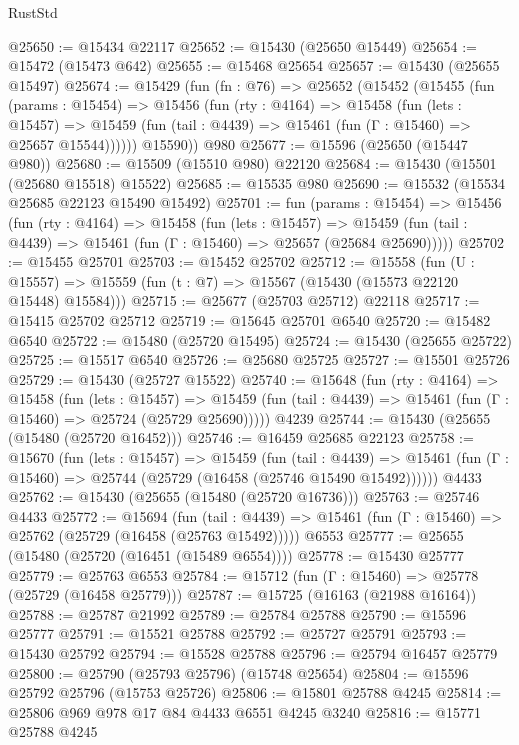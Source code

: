 \begin{lexlean}{RustStd}
\begin{coremodule}
{\begin{coremodule}
{{{{{{{{{{{{{{{{{{{{{{{{{{{{{{{{{{{{{{{{{{{{{{{{{{{{{{{{{{{{@25650 := @15434 @22117
@25652 := @15430 (@25650 @15449)
@25654 := @15472 (@15473 @642)
@25655 := @15468 @25654
@25657 := @15430 (@25655 @15497)
@25674 := @15429
    (fun (fn : @76) =>
    @25652
      (@15452
        (@15455
          (fun (params : @15454) =>
          @15456
            (fun (rty : @4164) =>
            @15458
              (fun (lets : @15457) =>
              @15459 (fun (tail : @4439) => @15461 (fun (Γ : @15460) => @25657 @15544))))))
        @15590))
    @980
@25677 := @15596 (@25650 (@15447 @980))
@25680 := @15509 (@15510 @980) @22120
@25684 := @15430 (@15501 (@25680 @15518) @15522)
@25685 := @15535 @980
@25690 := @15532 (@15534 @25685 @22123 @15490 @15492)
@25701 := fun (params : @15454) =>
  @15456
    (fun (rty : @4164) =>
    @15458
      (fun (lets : @15457) =>
      @15459 (fun (tail : @4439) => @15461 (fun (Γ : @15460) => @25657 (@25684 @25690)))))
@25702 := @15455 @25701
@25703 := @15452 @25702
@25712 := @15558
    (fun (U : @15557) => @15559 (fun (t : @7) => @15567 (@15430 (@15573 @22120 @15448) @15584)))
@25715 := @25677 (@25703 @25712) @22118
@25717 := @15415 @25702 @25712
@25719 := @15645 @25701 @6540
@25720 := @15482 @6540
@25722 := @15480 (@25720 @15495)
@25724 := @15430 (@25655 @25722)
@25725 := @15517 @6540
@25726 := @25680 @25725
@25727 := @15501 @25726
@25729 := @15430 (@25727 @15522)
@25740 := @15648
    (fun (rty : @4164) =>
    @15458
      (fun (lets : @15457) =>
      @15459 (fun (tail : @4439) => @15461 (fun (Γ : @15460) => @25724 (@25729 @25690)))))
    @4239
@25744 := @15430 (@25655 (@15480 (@25720 @16452)))
@25746 := @16459 @25685 @22123
@25758 := @15670
    (fun (lets : @15457) =>
    @15459
      (fun (tail : @4439) =>
      @15461 (fun (Γ : @15460) => @25744 (@25729 (@16458 (@25746 @15490 @15492))))))
    @4433
@25762 := @15430 (@25655 (@15480 (@25720 @16736)))
@25763 := @25746 @4433
@25772 := @15694
    (fun (tail : @4439) => @15461 (fun (Γ : @15460) => @25762 (@25729 (@16458 (@25763 @15492)))))
    @6553
@25777 := @25655 (@15480 (@25720 (@16451 (@15489 @6554))))
@25778 := @15430 @25777
@25779 := @25763 @6553
@25784 := @15712 (fun (Γ : @15460) => @25778 (@25729 (@16458 @25779)))
@25787 := @15725 (@16163 (@21988 @16164))
@25788 := @25787 @21992
@25789 := @25784 @25788
@25790 := @15596 @25777
@25791 := @15521 @25788
@25792 := @25727 @25791
@25793 := @15430 @25792
@25794 := @15528 @25788
@25796 := @25794 @16457 @25779
@25800 := @25790 (@25793 @25796) (@15748 @25654)
@25804 := @15596 @25792 @25796 (@15753 @25726)
@25806 := @15801 @25788 @4245
@25814 := @25806 @969 @978 @17 @84 @4433 @6551 @4245 @3240
@25816 := @15771 @25788 @4245
}}}}}}}}}}}}}}}}}}}}}}}}}}}}}}}}}}}}}}}}}}}}}}}}}}}}}}}}}}}}
\end{coremodule}}
\end{coremodule}
\end{lexlean}
